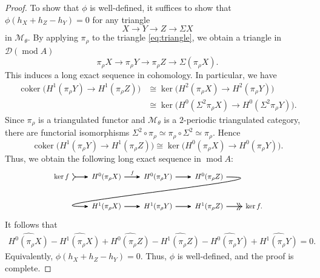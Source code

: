 \documentclass[12pt,reqno]{amsart}
\numberwithin{equation}{section}
\renewcommand{\mod}{\operatorname{mod}\nolimits}
\begin{document}
\begin{proof}
		To show that $\phi$ is well-defined, it suffices to show that $\phi(h_X+h_Z-h_Y)=0$ for any triangle 
		\begin{equation}\label{eq:triangle}
			X\longrightarrow Y\longrightarrow Z\longrightarrow \Sigma X
		\end{equation}
		in $\mathcal{M}_\theta$.
		By applying $\pi_\rho$ to the triangle \eqref{eq:triangle}, we obtain  a triangle in $\mathcal{D}(\mod A)$
		\begin{equation}\label{eq:triangle-DA}
			\pi_\rho X\longrightarrow \pi_\rho Y\longrightarrow \pi_\rho Z\longrightarrow  
			\Sigma (\pi_\rho X).
		\end{equation}
		This induces a long exact sequence in cohomology. In particular, we have
		\begin{align*}
			\operatorname{coker}\bigl( H^{1}(\pi_\rho Y)\rightarrow H^{1}(\pi_\rho Z) \bigr)
			&\cong
			\ker \bigl( H^{2}(\pi_\rho X)\rightarrow H^{2}(\pi_\rho Y) \bigr)\\
			&\cong
			\ker \bigl( H^{0}(\Sigma^2\pi_\rho X)\rightarrow H^{0}(\Sigma^2\pi_\rho Y) \bigr).
		\end{align*}
		Since $\pi_\rho$ is a triangulated functor and $\mathcal{M}_\theta$ is a
		$2$-periodic triangulated category, there are functorial isomorphisms
		$\Sigma^2\circ \pi_\rho \simeq \pi_\rho\circ \Sigma^2 \simeq \pi_\rho.$
		Hence
		\[
		\operatorname{coker}\bigl( H^{1}(\pi_\rho Y)\rightarrow H^{1}(\pi_\rho Z) \bigr)
		\cong
		\ker \bigl( H^{0}(\pi_\rho X)\rightarrow H^{0}(\pi_\rho Y) \bigr).
		\]
		Thus, we obtain the following long exact sequence in $\mod A$:
		\[
		\begin{tikzcd}[
			column sep=0.8cm, 
			row sep=0.8cm,
			arrows={-Stealth, thick}
			]
			\ker f \arrow[r, tail] & 
			H^{0} (\pi_\rho X) \arrow[r,"f"] & 
			H^{0} (\pi_\rho Y) \arrow[r] & 
			H^{0} (\pi_\rho Z) \arrow[lld, out=0, in=-180, looseness=1.5] \\
			& 
			H^{1} (\pi_\rho X) \arrow[r] & 
			H^{1} (\pi_\rho Y) \arrow[r] & 
			H^{1} (\pi_\rho Z) \arrow[r, two heads] & 
			\ker f.
		\end{tikzcd}
		\]
		It follows that 
		\begin{align*}
			\widehat{H^0(\pi_\rho X)}-\widehat{H^1(\pi_\rho X)}+\widehat{H^0(\pi_\rho Z)}-\widehat{H^1(\pi_\rho Z)} 
			-\widehat{H^0(\pi_\rho Y)}+\widehat{H^1(\pi_\rho Y)}=0.
		\end{align*}
		Equivalently,
		$\phi(h_X+h_Z-h_Y)=0.$
		Thus, $\phi$ is well-defined, and the proof is complete.
	\end{proof}
	
\end{document}
